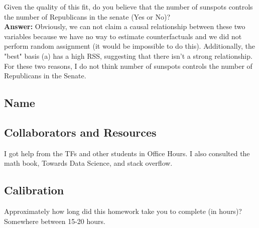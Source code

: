 \documentclass[submit]{harvardml}
\begin{document}
\begin{enumerate}
Given the quality of this fit, do you believe that the number of sunspots controls the number of Republicans in the senate (Yes or No)?\\

\textbf{Answer:} Obviously, we can not claim a causal relationship between these two variables because we have no way to estimate counterfactuals and we did not perform random assignment (it would be impossible to do this). Additionally, the "best" basis (a) has a  high RSS, suggesting that there isn't a strong relationship. For these two reasons, I do not think number of sunspots controls the number of Republicans in the Senate. 
\end{enumerate}



\newpage
\subsection*{Name}

\subsection*{Collaborators and Resources}
I got help from the TFs and other students in Office Hours. I also consulted the math book, Towards Data Science, and stack overflow.

\subsection*{Calibration}
Approximately how long did this homework take you to complete (in hours)? \\
Somewhere between 15-20 hours.
\end{document}
